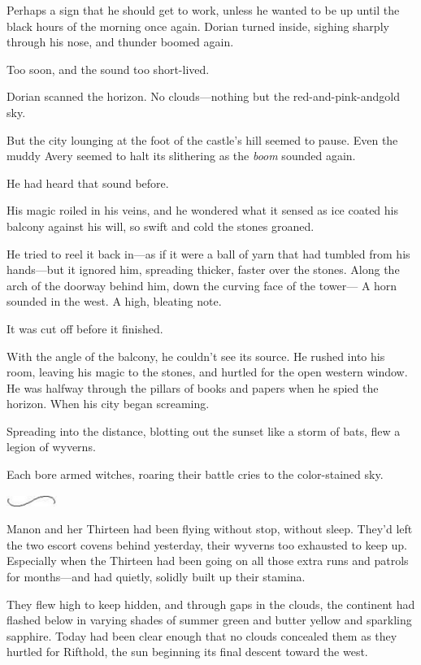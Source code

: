 Perhaps a sign that he should get to work, unless he wanted to be up until the black hours of the morning once again. Dorian turned inside, sighing sharply through his nose, and thunder boomed again.

Too soon, and the sound too short-lived.

Dorian scanned the horizon. No clouds---nothing but the red-and-pink-andgold sky.

But the city lounging at the foot of the castle's hill seemed to pause. Even the muddy Avery seemed to halt its slithering as the \emph{boom}
sounded again.

He had heard that sound before.

His magic roiled in his veins, and he wondered what it sensed as ice coated his balcony against his will, so swift and cold the stones groaned.

He tried to reel it back in---as if it were a ball of yarn that had tumbled from his hands---but it ignored him, spreading thicker, faster over the stones. Along the arch of the doorway behind him, down the curving face of the tower--- A horn sounded in the west. A high, bleating note.

It was cut off before it finished.

With the angle of the balcony, he couldn't see its source. He rushed into his room, leaving his magic to the stones, and hurtled for the open western window. He was halfway through the pillars of books and papers when he spied the horizon. When his city began screaming.

Spreading into the distance, blotting out the sunset like a storm of bats, flew a legion of wyverns.

Each bore armed witches, roaring their battle cries to the color-stained sky.

\includegraphics[width=0.65in,height=0.13in]{images/seperator}

Manon and her Thirteen had been flying without stop, without sleep. They'd left the two escort covens behind yesterday, their wyverns too exhausted to keep up. Especially when the Thirteen had been going on all those extra runs and patrols for months---and had quietly, solidly built up their stamina.

They flew high to keep hidden, and through gaps in the clouds, the continent had flashed below in varying shades of summer green and butter yellow and sparkling sapphire. Today had been clear enough that no clouds concealed them as they hurtled for Rifthold, the sun beginning its final descent toward the west.

